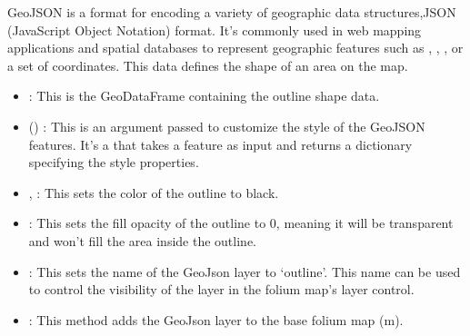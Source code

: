 \documentclass[letterpaper,10pt,english]{sphinxmanual}
\begin{document}
\sphinxAtStartPar
GeoJSON is a format for encoding a variety of geographic data structures,JSON (JavaScript Object Notation) format. It’s commonly used in web mapping applications and spatial databases to represent geographic features such as , , , or a set of coordinates.
This data defines the shape of an area on the map.
\begin{itemize}
\item {} 
\sphinxAtStartPar
{}: This is the GeoDataFrame containing the outline shape data.

\item {} 
\sphinxAtStartPar
{} ()  : This is an argument passed to customize the style of the GeoJSON features. It’s a  that takes a feature as input and returns a dictionary specifying the style properties.

\item {} 
\sphinxAtStartPar
{},  : This sets the color of the outline to black.

\item {} 
\sphinxAtStartPar
{} : This sets the fill opacity of the outline to 0, meaning it will be transparent and won’t fill the area inside the outline.

\item {} 
\sphinxAtStartPar
{}  : This sets the name of the GeoJson layer to ‘outline’. This name can be used to control the visibility of the layer in the folium map’s layer control.

\item {} 
\sphinxAtStartPar
{} : This method adds the GeoJson layer to the base folium map (m).

\end{itemize}
\end{document}
